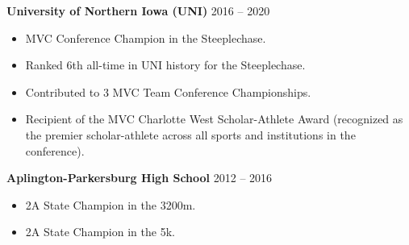 \item \textbf{University of Northern Iowa (UNI)} \hfill 2016 -- 2020
\begin{itemize}
    \item MVC Conference Champion in the Steeplechase.
    \item Ranked 6th all-time in UNI history for the Steeplechase.
    \item Contributed to 3 MVC Team Conference Championships.
    \item Recipient of the MVC Charlotte West Scholar-Athlete Award (recognized as the premier scholar-athlete across all sports and institutions in the conference).
\end{itemize}

\item \textbf{Aplington-Parkersburg High School} \hfill 2012 -- 2016
\begin{itemize}
    \item 2A State Champion in the 3200m.
    \item 2A State Champion in the 5k.
\end{itemize}